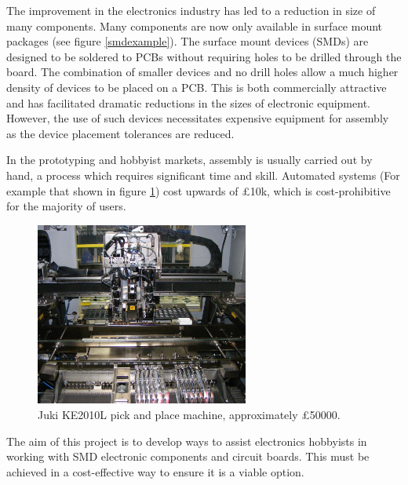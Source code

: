 The improvement in the electronics industry has led to a reduction in 
size of many components. Many components are now only available in
surface mount packages (see figure \ref{smdexample}). The surface mount 
devices (\gls{SMD}s) are designed to be soldered to \gls{PCB}s without
requiring holes to be drilled through the board. The combination of
smaller devices and no drill holes allow a much higher density of
devices to be placed on a PCB. This is both commercially
attractive and has facilitated dramatic reductions in the sizes of
electronic equipment. However, the use of such devices necessitates expensive 
equipment for assembly as the device placement tolerances are reduced.

In the prototyping and hobbyist markets, assembly is usually carried
out by hand, a process which requires significant time and skill. 
Automated systems (For example that shown in figure \ref{pickandplace}) cost upwards of \pounds 10k, which is cost-prohibitive
for the majority of users. 

\begin{figure}[ht!]
\centering
\includegraphics[width=70mm]{resources/pickandplace.jpg}
\caption{Juki KE2010L pick and place machine, approximately \pounds 50000.}
\label{pickandplace}
\end{figure}

The aim of this project is to develop ways to assist electronics 
hobbyists in working with SMD electronic components and circuit boards.
This must be achieved in a cost-effective way to ensure it is a viable
option.


 




